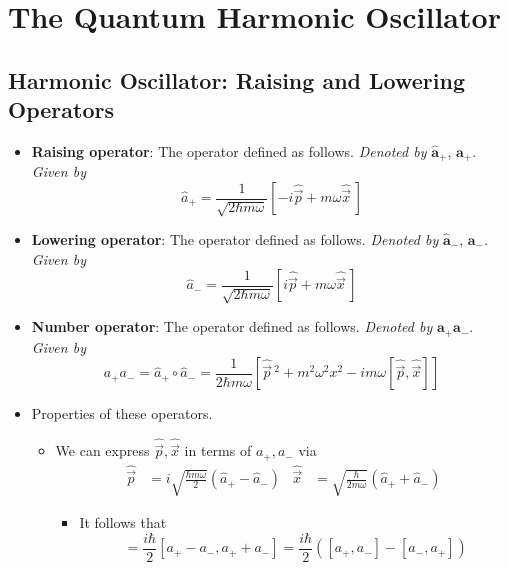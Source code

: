 \documentclass[../notes.tex]{subfiles}
\begin{document}
\chapter{The Quantum Harmonic Oscillator}
\section{Harmonic Oscillator: Raising and Lowering Operators}
\begin{itemize}
    \item {}\textbf{Raising operator}: The operator defined as follows. \emph{Denoted by} $\bm{\hat{a}_+}$, $\bm{a_+}$. \emph{Given by}
    \begin{equation*}
        \hat{a}_+ = \frac{1}{\sqrt{2\hbar m\omega}}[-i\hat{\vec{p}}+m\omega\hat{\vec{x}}\,]
    \end{equation*}
    \item \textbf{Lowering operator}: The operator defined as follows. \emph{Denoted by} $\bm{\hat{a}_-}$, $\bm{a_-}$. \emph{Given by}
    \begin{equation*}
        \hat{a}_- = \frac{1}{\sqrt{2\hbar m\omega}}[i\hat{\vec{p}}+m\omega\hat{\vec{x}}\,]
    \end{equation*}
    \item \textbf{Number operator}: The operator defined as follows. \emph{Denoted by} $\bm{a_+a_-}$. \emph{Given by}
    \begin{equation*}
        a_+a_- = \hat{a}_+\circ\hat{a}_-
        = \frac{1}{2\hbar m\omega}\left[ \hat{\vec{p}}{\,}^2+m^2\omega^2x^2-im\omega[\hat{\vec{p}},\hat{\vec{x}}] \right]
    \end{equation*}
    \item Properties of these operators.
    \begin{itemize}
        \item We can express $\hat{\vec{p}},\hat{\vec{x}}$ in terms of $a_+,a_-$ via
        \begin{align*}
            \hat{\vec{p}} &= i\sqrt{\frac{\hbar m\omega}{2}}(\hat{a}_+-\hat{a}_-)&
            \hat{\vec{x}} &= \sqrt{\frac{\hbar}{2m\omega}}(\hat{a}_++\hat{a}_-)
        \end{align*}
        \begin{itemize}
            \item It follows that
            \begin{equation*}
                [\hat{\vec{p}},\hat{\vec{x}}] = \frac{i\hbar}{2}[a_+-a_-,a_++a_-]
                = \frac{i\hbar}{2}([a_+,a_-]-[a_-,a_+])

\end{equation*}
\end{itemize}
\end{itemize}
\end{itemize}
\end{document}
